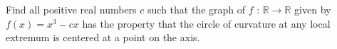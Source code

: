 Find all positive real numbers $c$ such that the graph of $f\text{ : }\mathbb{R}\to\mathbb{R}$ given by $f(x)=x^3-cx$ has the property that the circle of curvature at any local extremum is centered at a point on the axis.